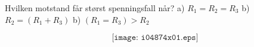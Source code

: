 

Hvilken motstand får størst spenningsfall når?
\vskip 10pt
a) $R_1=R_2=R_3$
\vskip 10pt
b) $R_2=(R_1+R_3)$
\vskip 10pt
b) $(R_1=R_3)>R_2$
\vskip 10pt

$$\texttt{[image: i04874x01.eps]}$$




















